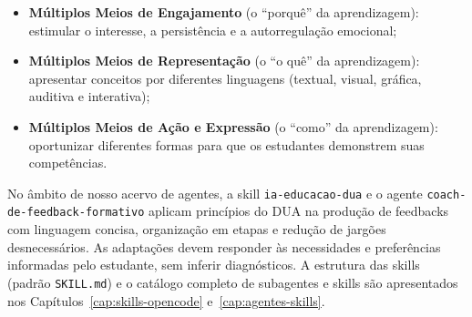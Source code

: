 \begin{itemize}
  \item \textbf{M{\'u}ltiplos Meios de Engajamento} (o ``porqu{\^e}'' da aprendizagem): estimular o interesse, a persist{\^e}ncia e a autorregula{\c c}{\~a}o emocional;
  \item \textbf{M{\'u}ltiplos Meios de Representa{\c c}{\~a}o} (o ``o qu{\^e}'' da aprendizagem): apresentar conceitos por diferentes linguagens (textual, visual, gr{\'a}fica, auditiva e interativa);
  \item \textbf{M{\'u}ltiplos Meios de A{\c c}{\~a}o e Express{\~a}o} (o ``como'' da aprendizagem): oportunizar diferentes formas para que os estudantes demonstrem suas compet{\^e}ncias.
\end{itemize}

No {\^a}mbito de nosso acervo de agentes, a skill \texttt{ia-educacao-dua} e o agente \texttt{coach-de-feedback-formativo} aplicam princ{\'i}pios do DUA na produ{\c c}{\~a}o de feedbacks com linguagem concisa, organiza{\c c}{\~a}o em etapas e redu{\c c}{\~a}o de jarg{\~o}es desnecess{\'a}rios. As adapta{\c c}{\~o}es devem responder {\`a}s necessidades e prefer{\^e}ncias informadas pelo estudante, sem inferir diagn{\'o}sticos. A estrutura das skills (padr{\~a}o \texttt{SKILL.md}) e o cat{\'a}logo completo de subagentes e skills s{\~a}o apresentados nos Cap{\'i}tulos~\ref{cap:skills-opencode} e~\ref{cap:agentes-skills}.
